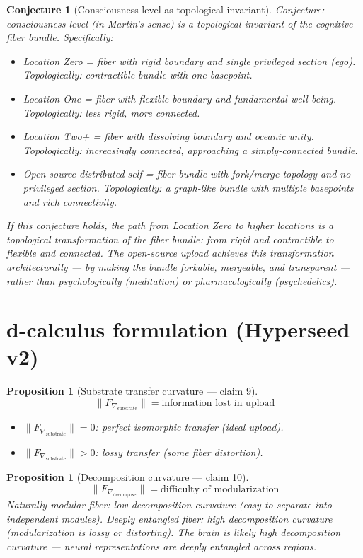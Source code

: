 \documentclass[11pt,a4paper]{article}
\newtheorem{proposition}[definition]{Proposition}
\newtheorem{conjecture}[definition]{Conjecture}
\begin{document}
\begin{conjecture}[Consciousness level as topological invariant]
Conjecture: consciousness level (in Martin's sense) is a topological
invariant of the cognitive fiber bundle. Specifically:
\begin{itemize}
\item Location Zero = fiber with rigid boundary and single privileged
  section (ego). Topologically: contractible bundle with one basepoint.
\item Location One = fiber with flexible boundary and fundamental
  well-being. Topologically: less rigid, more connected.
\item Location Two+ = fiber with dissolving boundary and oceanic unity.
  Topologically: increasingly connected, approaching a simply-connected
  bundle.
\item Open-source distributed self = fiber bundle with fork/merge topology
  and no privileged section. Topologically: a graph-like bundle with
  multiple basepoints and rich connectivity.
\end{itemize}

If this conjecture holds, the path from Location Zero to higher locations
is a topological transformation of the fiber bundle: from rigid and
contractible to flexible and connected. The open-source upload achieves
this transformation architecturally --- by making the bundle forkable,
mergeable, and transparent --- rather than psychologically (meditation)
or pharmacologically (psychedelics).
\end{conjecture}

\section{d-calculus formulation (Hyperseed v2)}

\begin{proposition}[Substrate transfer curvature --- claim 9]
\label{prop:substrate}
\[
  \|F_{\nabla_{\text{substrate}}}\| = \text{information lost in upload}
\]
\begin{itemize}
  \item $\|F_{\nabla_{\text{substrate}}}\| = 0$: perfect isomorphic
    transfer (ideal upload).
  \item $\|F_{\nabla_{\text{substrate}}}\| > 0$: lossy transfer
    (some fiber distortion).
\end{itemize}
\end{proposition}

\begin{proposition}[Decomposition curvature --- claim 10]
\label{prop:decompose}
\[
  \|F_{\nabla_{\text{decompose}}}\| = \text{difficulty of modularization}
\]
Naturally modular fiber: low decomposition curvature (easy to
separate into independent modules). Deeply entangled fiber: high
decomposition curvature (modularization is lossy or distorting).
The brain is likely high decomposition curvature --- neural
representations are deeply entangled across regions.
\end{proposition}
\end{document}
